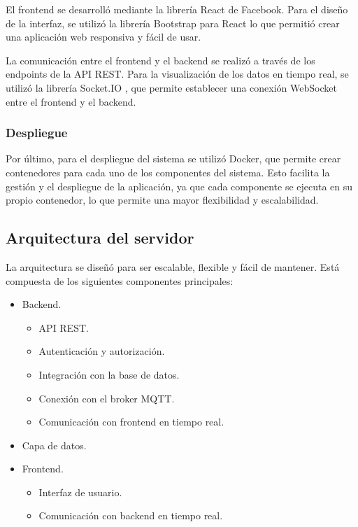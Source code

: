 El frontend se desarrolló mediante la librería React de Facebook. Para el
diseño de la interfaz, se utilizó la librería Bootstrap para React
\cite{ReactBootstrap} lo que permitió crear una aplicación web responsiva y
fácil de usar.

La comunicación entre el frontend y el backend se realizó a través de los
endpoints de la API REST. Para la visualización de los datos en tiempo real, se
utilizó la librería Socket.IO \cite{SocketIO}, que permite establecer una
conexión WebSocket entre el frontend y el backend.

\subsubsection{Despliegue}

Por último, para el despliegue del sistema se utilizó Docker, que permite crear
contenedores para cada uno de los componentes del sistema. Esto facilita la
gestión y el despliegue de la aplicación, ya que cada componente se ejecuta en
su propio contenedor, lo que permite una mayor flexibilidad y escalabilidad.


\subsection{Arquitectura del servidor}

La arquitectura se diseñó para ser escalable, flexible y fácil de mantener.
Está compuesta de los siguientes componentes principales:

\begin{itemize}
    \item Backend.
          \begin{itemize}
              \item API REST.
              \item Autenticación y autorización.
              \item Integración con la base de datos.
              \item Conexión con el broker MQTT.
              \item Comunicación con frontend en tiempo real. %
          \end{itemize}
    \item Capa de datos.
    \item Frontend.
          \begin{itemize}
              \item Interfaz de usuario.
              \item Comunicación con backend en tiempo real. %
          \end{itemize}
\end{itemize}

